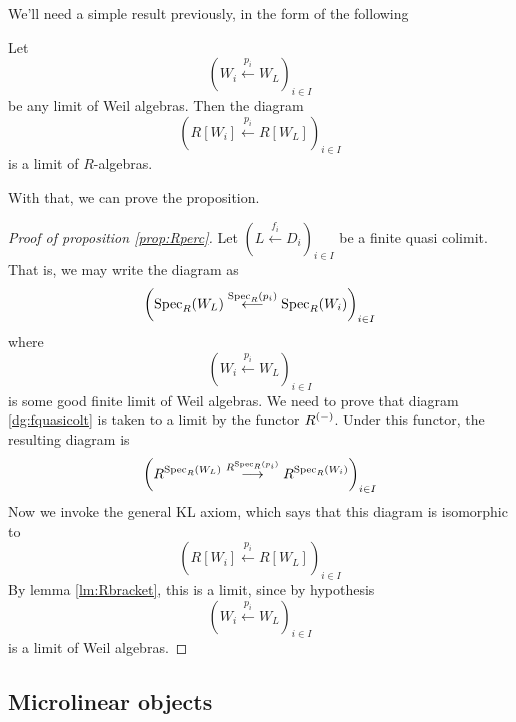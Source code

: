 We'll need a simple result previously, in the form of the following

\begin{lemma}
  Let 
  \begin{equation*}
   \left(W_i\stackrel{p_i}{\longleftarrow}W_L\right)_{i\in I}
  \end{equation*}
  be any limit of Weil algebras. Then the diagram
  \begin{equation*}
    \left(R[W_i]\stackrel{p_i}{\longleftarrow}R[W_L]\right)_{i\in I}
  \end{equation*}
  is a limit of \( R \)-algebras.  
  \label{lm:Rbracket}
\end{lemma}

With that, we can prove the proposition.

\begin{proof}[Proof of proposition \ref{prop:Rperc}]
  Let \( \left(L\stackrel{f_i}{\longleftarrow}D_i\right)_{i\in I} \) be a finite quasi colimit. That is, we may write the diagram as
  \begin{equation}
    \left(\operatorname{Spec}_R(W_L)\stackrel{\operatorname{Spec}_R(p_i)}{\longleftarrow}\operatorname{Spec}_R(W_i)\right)_{i\in I}
    \label{dg:fquasicolt}
  \end{equation}
  where
  \begin{equation*}
   \left(W_i\stackrel{p_i}{\longleftarrow}W_L\right)_{i\in I}
  \end{equation*}
  is some good finite limit of Weil algebras. We need to prove that diagram \ref{dg:fquasicolt} is taken to a limit by the functor \( R^{(-)} \). Under this functor, the resulting diagram is
  \begin{equation}
    \left(R^{\operatorname{Spec}_R(W_L)}\stackrel{R^{\operatorname{Spec}_R(p_i)}}{\longrightarrow}R^{\operatorname{Spec}_R(W_i)}\right)_{i\in I}
    \label{dg:Rfqc}
  \end{equation}
  Now we invoke the general KL axiom, which says that this diagram is isomorphic to
  \begin{equation*}
    \left(R[W_i]\stackrel{p_i}{\longleftarrow}R[W_L]\right)_{i\in I}
  \end{equation*}
  By lemma \ref{lm:Rbracket}, this is a limit, since by hypothesis
  \begin{equation*}
   \left(W_i\stackrel{p_i}{\longleftarrow}W_L\right)_{i\in I}
  \end{equation*} 
  is a limit of Weil algebras.
\end{proof}

\subsection{Microlinear objects}

